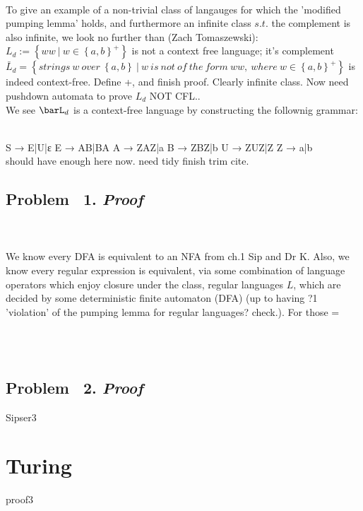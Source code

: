 \documentclass{article}
\theoremstyle{mydef}
\theoremstyle{mythm}
\theoremstyle{mylemming}
\theoremstyle{myq}
\begin{document}
\\
To give an example of a non-trivial class of langauges for which the 'modified pumping lemma' holds, and furthermore an infinite class $s.t.$ the complement is also infinite, we look no further than (Zach Tomaszewski): 
\\
$L_{d}:=\left\{ ww\  |\  w\in \left\{ a,b\right\}^{+}  \right\}  $ is not a context free language; it's complement $\bar{L}_{d} =\left\{ strings\  w\  over\  \left\{ a,b\right\}  \  |\  w\  is\  not\  of\  the\  form\  ww,\  where\  w\in \left\{ a,b\right\}^{+}  \right\}  $ is indeed context-free. Define +, and finish proof. Clearly infinite class. Now need pushdown automata to prove $L_{d}$ NOT CFL..
\\
We see $\barL_{d}$ is a context-free language by constructing the follownig grammar:

\\
S → E|U|ε E → AB|BA A → ZAZ|a B → ZBZ|b U → ZUZ|Z Z → a|b
\\

should have enough here now. need tidy finish trim cite.
\newpage
\subsection{\small{Problem \ 1.} \normalsize\textit{Proof}}
 \vspace{25}\\
\qone 
\proofone
\\
\newpage
We know every DFA is equivalent to an NFA from ch.1 Sip and Dr K. Also, we know every regular expression is equivalent, via some combination of language operators which enjoy closure under the class, regular languages $L$, which are decided by some deterministic finite automaton (DFA) (up to having ?1 'violation' of the pumping lemma for regular languages? check.). For those  =
\\
\thmtrytch

\newpage

\\
\\
\newpage

\subsection{\small{Problem \ 2.} \normalsize\textit{Proof}}
\qtwo
\prooftwo
{Sipser3}
\newpage
\section{Turing}
{}
{}
{}
\thmsavage
{proof3}
\newpage
\end{document}
